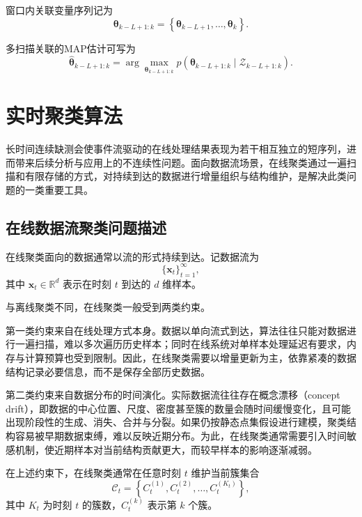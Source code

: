 \documentclass{xdupgthesis}
\begin{document}
窗口内关联变量序列记为
\begin{equation}
	\boldsymbol{\theta}_{k-L+1:k}
	=
	\left\{
	\boldsymbol{\theta}_{k-L+1},\ldots,\boldsymbol{\theta}_k
	\right\}.
\end{equation}

多扫描关联的MAP估计可写为
\begin{equation}
	\hat{\boldsymbol{\theta}}_{k-L+1:k}
	=
	\arg\max_{\boldsymbol{\theta}_{k-L+1:k}}
	p\left(
	\boldsymbol{\theta}_{k-L+1:k}
	\mid
	\mathcal{Z}_{k-L+1:k}
	\right).
\end{equation}

\section{实时聚类算法}

长时间连续缺测会使事件流驱动的在线处理结果表现为若干相互独立的短序列，进而带来后续分析与应用上的不连续性问题。面向数据流场景，在线聚类通过一遍扫描和有限存储的方式，对持续到达的数据进行增量组织与结构维护，是解决此类问题的一类重要工具。

\subsection{在线数据流聚类问题描述}

在线聚类面向的数据通常以流的形式持续到达。记数据流为
\[
\{ \mathbf{x}_t \}_{t=1}^{\infty},
\]
其中 $\mathbf{x}_t\in\mathbb{R}^d$ 表示在时刻 $t$ 到达的 $d$ 维样本。

与离线聚类不同，在线聚类一般受到两类约束。

第一类约束来自在线处理方式本身。数据以单向流式到达，算法往往只能对数据进行一遍扫描，难以多次遍历历史样本；同时在线系统对单样本处理延迟有要求，内存与计算预算也受到限制。因此，在线聚类需要以增量更新为主，依靠紧凑的数据结构记录必要信息，而不是保存全部历史数据。

第二类约束来自数据分布的时间演化。实际数据流往往存在概念漂移（concept drift），即数据的中心位置、尺度、密度甚至簇的数量会随时间缓慢变化，且可能出现阶段性的生成、消失、合并与分裂。如果仍按静态点集假设进行建模，聚类结构容易被早期数据束缚，难以反映近期分布。为此，在线聚类通常需要引入时间敏感机制，使近期样本对当前结构贡献更大，而较早样本的影响逐渐减弱。

在上述约束下，在线聚类通常在任意时刻 $t$ 维护当前簇集合
\begin{equation}
	\mathcal{C}_t
	=
	\left\{
	C_t^{(1)},C_t^{(2)},\ldots,C_t^{(K_t)}
	\right\},
\end{equation}
其中 $K_t$ 为时刻 $t$ 的簇数，$C_t^{(k)}$ 表示第 $k$ 个簇。
\end{document}
